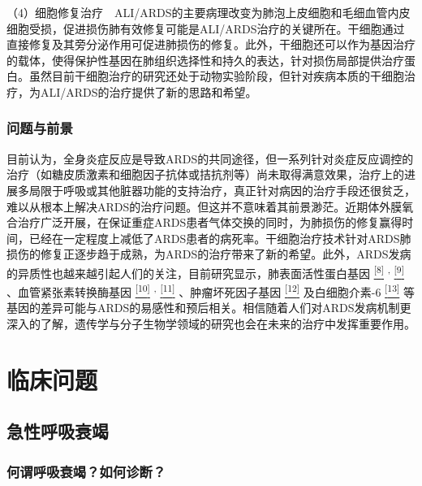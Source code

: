 （4）细胞修复治疗　ALI/ARDS的主要病理改变为肺泡上皮细胞和毛细血管内皮细胞受损，促进损伤肺有效修复可能是ALI/ARDS治疗的关键所在。干细胞通过直接修复及其旁分泌作用可促进肺损伤的修复。此外，干细胞还可以作为基因治疗的载体，使得保护性基因在肺组织选择性和持久的表达，针对损伤局部提供治疗蛋白。虽然目前干细胞治疗的研究还处于动物实验阶段，但针对疾病本质的干细胞治疗，为ALI/ARDS的治疗提供了新的思路和希望。

\subsubsection{问题与前景}

目前认为，全身炎症反应是导致ARDS的共同途径，但一系列针对炎症反应调控的治疗（如糖皮质激素和细胞因子抗体或拮抗剂等）尚未取得满意效果，治疗上的进展多局限于呼吸或其他脏器功能的支持治疗，真正针对病因的治疗手段还很贫乏，难以从根本上解决ARDS的治疗问题。但这并不意味着其前景渺茫。近期体外膜氧合治疗广泛开展，在保证重症ARDS患者气体交换的同时，为肺损伤的修复赢得时间，已经在一定程度上减低了ARDS患者的病死率。干细胞治疗技术针对ARDS肺损伤的修复正逐步趋于成熟，为ARDS的治疗带来了新的希望。此外，ARDS发病的异质性也越来越引起人们的关注，目前研究显示，肺表面活性蛋白基因
\protect\hyperlink{text00011.htmlux5cux23ch8-10}{\textsuperscript{{[}8{]}}}
\textsuperscript{,}
\protect\hyperlink{text00011.htmlux5cux23ch9-10}{\textsuperscript{{[}9{]}}}
、血管紧张素转换酶基因
\protect\hyperlink{text00011.htmlux5cux23ch10-10}{\textsuperscript{{[}10{]}}}
\textsuperscript{,}
\protect\hyperlink{text00011.htmlux5cux23ch11-10}{\textsuperscript{{[}11{]}}}
、肿瘤坏死因子基因
\protect\hyperlink{text00011.htmlux5cux23ch12-10}{\textsuperscript{{[}12{]}}}
及白细胞介素-6
\protect\hyperlink{text00011.htmlux5cux23ch13-10}{\textsuperscript{{[}13{]}}}
等基因的差异可能与ARDS的易感性和预后相关。相信随着人们对ARDS发病机制更深入的了解，遗传学与分子生物学领域的研究也会在未来的治疗中发挥重要作用。

\section{临床问题}

\subsection{急性呼吸衰竭}

\subsubsection{何谓呼吸衰竭？如何诊断？}

